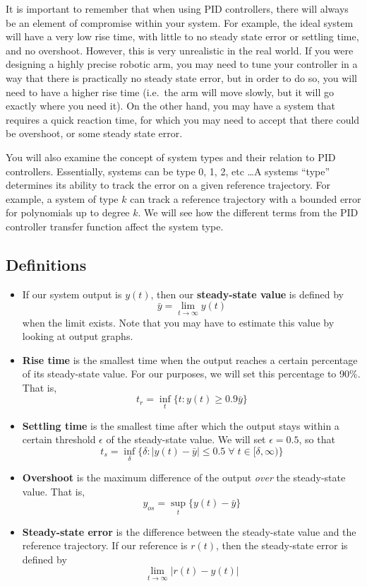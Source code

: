 It is important to remember that when using  PID controllers, there will always be an element of
compromise within your system. For example, the ideal system will have a very low rise time, with
little to no steady state error or settling time, and no overshoot. However, this is very unrealistic in
the real world. If you were designing a highly precise robotic arm, you may need to tune your
controller in a way that there is practically no steady state error, but in order to do so, you will need to
have a higher rise time (i.e.\ the arm will move slowly, but it will go exactly where you need it). On
the other hand, you may have a system that requires a quick reaction time, for which you may need
to accept that there could be overshoot, or some steady state error.

You will also examine the concept of system types and their relation to PID controllers. Essentially,
systems can be type 0, 1, 2, etc \ldots A systems ``type'' determines its ability to track
the error on a given reference trajectory. For example, a system of type \(k \) can track
a reference trajectory with a bounded error for polynomials up to degree \(k \). We will see how the different terms from the PID controller transfer function affect the system type.

\subsection{Definitions}
\begin{itemize}
    \item If our system output is \( y(t) \), then our \textbf{steady-state value} is defined by
          \[ \bar{y} = \lim_{t \to \infty}y(t) \]
          when the limit exists. Note that you may have to estimate this value by looking at output graphs.
    \item \textbf{Rise time} is the smallest time when the output reaches a certain percentage of its steady-state value. For our purposes, we will set this percentage to 90\%. That is,
          \[ t_r = \inf_t\{ t : y(t) \ge 0.9\bar{y} \} \]
    \item \textbf{Settling time} is the smallest time after which the output stays within a certain threshold \( \epsilon \) of the steady-state value. We will set \( \epsilon = 0.5 \), so that
          \[ t_s = \inf_{\delta}\{ \delta : |y(t) - \bar{y}| \le 0.5 \; \forall \; t \in [\delta, \infty)\} \]
    \item \textbf{Overshoot} is the maximum difference of the output \emph{over} the steady-state value. That is,
          \[ y_{os} = \sup_t \{y(t) - \bar{y}\} \]
    \item \textbf{Steady-state error} is the difference between the steady-state value and the reference trajectory. If our reference is \( r(t) \), then the steady-state error is defined by
          \[ \lim_{t \to \infty}|r(t) - y(t)| \]
\end{itemize}
